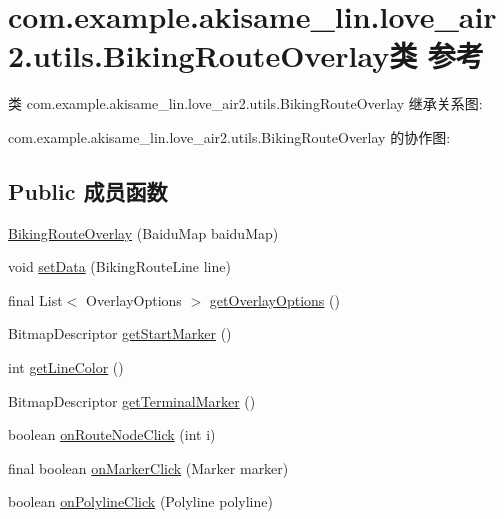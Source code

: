 \hypertarget{classcom_1_1example_1_1akisame__lin_1_1love__air2_1_1utils_1_1_biking_route_overlay}{}\section{com.\+example.\+akisame\+\_\+lin.\+love\+\_\+air2.\+utils.\+Biking\+Route\+Overlay类 参考}
\label{classcom_1_1example_1_1akisame__lin_1_1love__air2_1_1utils_1_1_biking_route_overlay}


类 com.\+example.\+akisame\+\_\+lin.\+love\+\_\+air2.\+utils.\+Biking\+Route\+Overlay 继承关系图\+:


com.\+example.\+akisame\+\_\+lin.\+love\+\_\+air2.\+utils.\+Biking\+Route\+Overlay 的协作图\+:
\subsection*{Public 成员函数}
\begin{DoxyCompactItemize}
\item 
\mbox{\hyperlink{classcom_1_1example_1_1akisame__lin_1_1love__air2_1_1utils_1_1_biking_route_overlay_acb4f80bbe9ecc9b169ac8d6c6ce17a2c}{Biking\+Route\+Overlay}} (Baidu\+Map baidu\+Map)
\item 
void \mbox{\hyperlink{classcom_1_1example_1_1akisame__lin_1_1love__air2_1_1utils_1_1_biking_route_overlay_a1427fd7e5fa9ba5bcd5035d242768359}{set\+Data}} (Biking\+Route\+Line line)
\item 
final List$<$ Overlay\+Options $>$ \mbox{\hyperlink{classcom_1_1example_1_1akisame__lin_1_1love__air2_1_1utils_1_1_biking_route_overlay_ae8c29f653e17b7ad1574d4dc020ff676}{get\+Overlay\+Options}} ()
\item 
Bitmap\+Descriptor \mbox{\hyperlink{classcom_1_1example_1_1akisame__lin_1_1love__air2_1_1utils_1_1_biking_route_overlay_a5d45c22bf828c771e03432602690562f}{get\+Start\+Marker}} ()
\item 
int \mbox{\hyperlink{classcom_1_1example_1_1akisame__lin_1_1love__air2_1_1utils_1_1_biking_route_overlay_ad0c0a3a523b70c366385af6b6c138fca}{get\+Line\+Color}} ()
\item 
Bitmap\+Descriptor \mbox{\hyperlink{classcom_1_1example_1_1akisame__lin_1_1love__air2_1_1utils_1_1_biking_route_overlay_a120a9f4a295a98c55874596697d827aa}{get\+Terminal\+Marker}} ()
\item 
boolean \mbox{\hyperlink{classcom_1_1example_1_1akisame__lin_1_1love__air2_1_1utils_1_1_biking_route_overlay_a5a707c5976ee268d34b7d76fae172b18}{on\+Route\+Node\+Click}} (int i)
\item 
final boolean \mbox{\hyperlink{classcom_1_1example_1_1akisame__lin_1_1love__air2_1_1utils_1_1_biking_route_overlay_ab3a60086babc833d8e1786b2441d6aaa}{on\+Marker\+Click}} (Marker marker)
\item 
boolean \mbox{\hyperlink{classcom_1_1example_1_1akisame__lin_1_1love__air2_1_1utils_1_1_biking_route_overlay_af79681190a4c62829784662c900c17e9}{on\+Polyline\+Click}} (Polyline polyline)
\end{DoxyCompactItemize}
